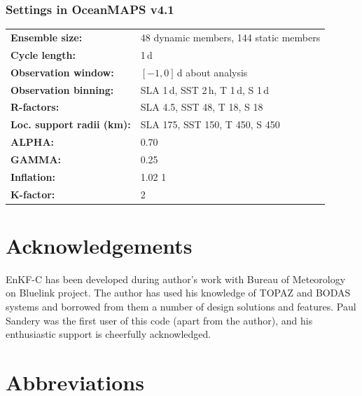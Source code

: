 \documentclass[11pt]{report}
\begin{document}
\subsection{Settings in OceanMAPS v4.1}
\label{sec:da-settings-example}

\begin{tabular}{ll}
  \bf Ensemble size: & 48 dynamic members, 144 static members\\
  \bf Cycle length: & 1\,d\\
  \bf Observation window: & $[-1, 0]$\,d about analysis\\
  \bf Observation binning: & SLA 1\,d, SST 2\,h, T 1\,d, S 1\,d\\
  \bf R-factors: & SLA 4.5, SST 48, T 18, S 18\\
  \bf Loc. support radii (km): & SLA 175, SST 150, T 450, S 450\\
  \bf ALPHA: & 0.70\\
  \bf GAMMA: & 0.25\\
  \bf Inflation: & 1.02 1\\
  \bf K-factor: & 2\\
\end{tabular}

\chapter*{Acknowledgements}

EnKF-C has been developed during author's work with Bureau of Meteorology on Bluelink project.
The author has used his knowledge of TOPAZ \citep{sak12b} and BODAS \citep{oke08b} systems and borrowed from them a number of design solutions and features.
Paul Sandery was the first user of this code (apart from the author), and his enthusiastic support is cheerfully acknowledged.

\clearpage

\nocite{eve94a}
\nocite{eve03a}
\nocite{hun04a}
\nocite{hun07a}
\nocite{sak08a}
\nocite{sak10a}
\nocite{sak11a}




\clearpage

\chapter*{Abbreviations}
\end{document}
